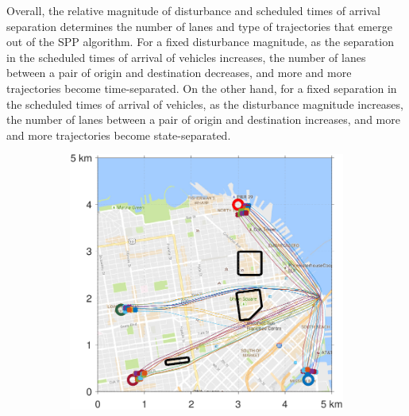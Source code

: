 Overall, the relative magnitude of disturbance and scheduled times of arrival separation determines the number of lanes and type of trajectories that emerge out of the SPP algorithm. For a fixed disturbance magnitude, as the separation in the scheduled times of arrival of vehicles increases, the number of lanes between a pair of origin and destination decreases, and more and more trajectories become time-separated. On the other hand, for a fixed separation in the scheduled times of arrival of vehicles, as the disturbance magnitude increases, the number of lanes between a pair of origin and destination increases, and more and more trajectories become state-separated.
%
\begin{figure}[!htb]
 \centering
\begin{subfigure}{0.5\textwidth}
  \includegraphics[width=\columnwidth]{figs/sf_d6sep0}
  \label{fig:sf_d6sep0}
\end{subfigure}%
\begin{subfigure}{0.5\textwidth}

\end{subfigure}
\end{figure}
